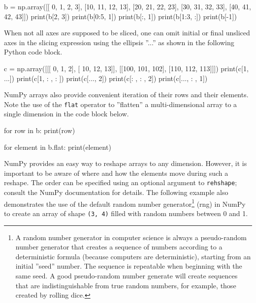 \begin{samepage}
\begin{pythoncode}
b = np.array([[ 0,  1,  2,  3],
              [10, 11, 12, 13],
              [20, 21, 22, 23],
              [30, 31, 32, 33],
              [40, 41, 42, 43]])
print(b[2, 3])
print(b[0:5, 1])
print(b[:, 1])
print(b[1:3, :])
print(b[-1])
\end{pythoncode}
\end{samepage}

When not all axes are supposed to be sliced, one can omit initial or final unsliced axes in the slicing expression using the ellipsis ''...'' as shown in the following Python code block.

\begin{samepage}
\begin{pythoncode}
c = np.array([[[  0,  1,  2],
               [ 10, 12, 13]],
              [[100, 101, 102],
               [110, 112, 113]]])
print(c[1, ...])
print(c[1, : , : ])
print(c[..., 2])
print(c[: , : , 2])
print(c[..., : , 1])
\end{pythoncode}
\end{samepage}

NumPy arrays also provide convenient iteration of their rows and their elements. Note the use of the \texttt{flat} operator to ''flatten'' a multi-dimensional array to a single dimension in the code block below.

\begin{samepage}
\begin{pythoncode}
for row in b:
    print(row)

for element in b.flat:
    print(element)
\end{pythoncode}
\end{samepage}

NumPy provides an easy way to reshape arrays to any dimension. However, it is important to be aware of where and how the elements move during such a reshape. The order can be specified using an optional argument to \texttt{rehshape}; consult the NumPy documentation for details. The following example also demonstrates the use of the default random number generator\footnote{A random number generator in computer science is always a pseudo-random number generator that creates a sequence of numbers according to a deterministic formula (because computers are deterministic), starting from an initial ''seed'' number. The sequence is repeatable when beginning with the same seed. A good pseudo-random number generate will create sequences that are indistinguishable from true random numbers, for example, those created by rolling dice.} (rng) in NumPy to create an array of shape \texttt{(3, 4)} filled with random numbers between 0 and 1.

